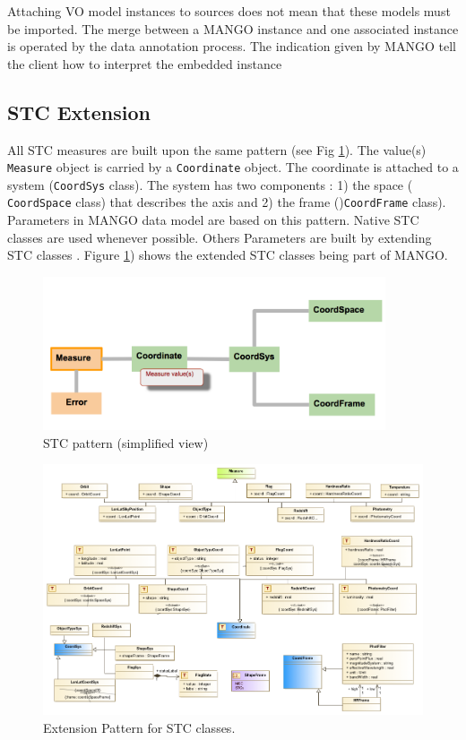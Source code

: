 \documentclass[11pt,a4paper]{ivoa}
\begin{document}
Attaching VO model instances to sources does not mean that these  models must be imported. The merge between a MANGO instance and one associated instance is operated by the data annotation process. The indication given by MANGO tell the client how to interpret the embedded instance

\subsection{STC Extension}

All STC measures are built upon the same pattern (see Fig \ref{fig:stcpattern}). The value(s) \texttt{Measure} object is carried by a \texttt{Coordinate} object. The coordinate is attached to a system  (\texttt{CoordSys} class). The system has two components : 1) the space  ( \texttt{CoordSpace} class) that describes the axis and 2) the frame ()\texttt{CoordFrame} class).  Parameters in MANGO data model are based on this pattern. Native STC classes are used whenever possible. Others Parameters are built by extending STC classes . Figure \ref{fig:stcpattern}) shows the extended STC classes being part of MANGO.
\begin{figure}
     \includegraphics[width=0.9\textwidth]{stc_pattern.png}
     \caption{STC pattern (simplified view)}
     \label{fig:stcpattern}
\end{figure}

\begin{figure}
  \includegraphics[angle=90,origin=c,width=1\textwidth]{../model/stc_ext_diagram.png}
  \caption{Extension Pattern for STC classes.}
  \label{fig:stcextension}
\end{figure}
\end{document}
